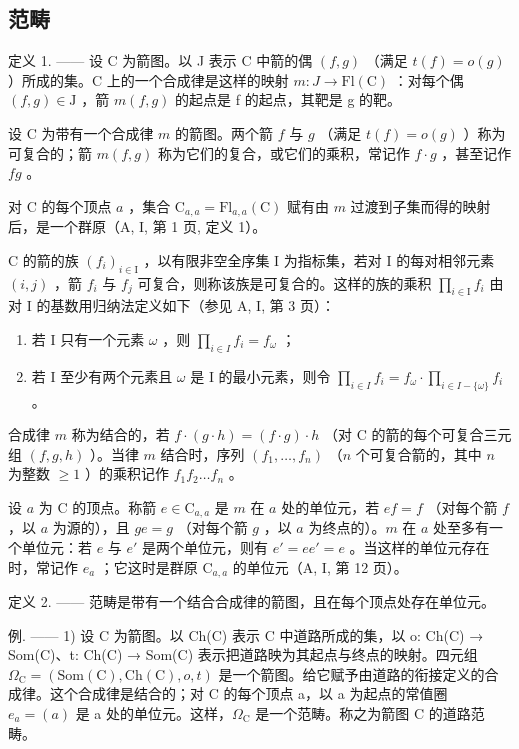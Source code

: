 \subsection{范畴}

定义 1. —— 设 C 为箭图。以 J 表示 C 中箭的偶 \((f,g)\) （满足 \(t(f)=o(g)\) ）所成的集。C 上的一个合成律是这样的映射 \(m:J\to\mathrm{Fl}(\mathrm{C})\) ：对每个偶 \((f,g)\in\mathrm{J}\) ，箭 \(m(f,g)\) 的起点是 f 的起点，其靶是 g 的靶。

设 C 为带有一个合成律 \(m\) 的箭图。两个箭 \(f\) 与 \(g\) （满足 \(t(f) = o(g)\) ）称为可复合的；箭 \(m(f, g)\) 称为它们的复合，或它们的乘积，常记作 \(f \cdot g\) ，甚至记作 \(fg\) 。

对 C 的每个顶点 \(a\) ，集合 \(\mathrm{C}_{a,a} = \mathrm{Fl}_{a,a}(\mathrm{C})\) 赋有由 \(m\) 过渡到子集而得的映射后，是一个群原（A, I, 第 1 页, 定义 1）。

C 的箭的族 \((f_{i})_{i\in\mathrm{I}}\) ，以有限非空全序集 I 为指标集，若对 I 的每对相邻元素 \((i,j)\) ，箭 \(f_{i}\) 与 \(f_{j}\) 可复合，则称该族是可复合的。这样的族的乘积 \(\prod_{i\in\mathrm{I}}f_{i}\) 由对 I 的基数用归纳法定义如下（参见 A, I, 第 3 页）：

\begin{enumerate}
\def\labelenumi{(\roman{enumi})}
\item
  若 I 只有一个元素 \(\omega\) ，则 \(\prod_{i\in I}f_i = f_\omega\) ；
\item
  若 I 至少有两个元素且 \(\omega\) 是 I 的最小元素，则令 \(\prod_{i\in I}f_i = f_\omega \cdot \prod_{i\in I - \{\omega \}}f_i\) 。
\end{enumerate}

合成律 \(m\) 称为结合的，若 \(f \cdot (g \cdot h) = (f \cdot g) \cdot h\) （对 C 的箭的每个可复合三元组 \((f, g, h)\) ）。当律 \(m\) 结合时，序列 \((f_1, \ldots, f_n)\) （\(n\) 个可复合箭的，其中 \(n\) 为整数 \(\geqslant 1\) ）的乘积记作 \(f_1 f_2 \ldots f_n\) 。

设 \(a\) 为 C 的顶点。称箭 \(e \in \mathrm{C}_{a,a}\) 是 \(m\) 在 \(a\) 处的单位元，若 \(ef = f\) （对每个箭 \(f\) ，以 \(a\) 为源的），且 \(ge = g\) （对每个箭 \(g\) ，以 \(a\) 为终点的）。\(m\) 在 \(a\) 处至多有一个单位元：若 \(e\) 与 \(e'\) 是两个单位元，则有 \(e' = ee' = e\) 。当这样的单位元存在时，常记作 \(e_a\) ；它这时是群原 \(\mathrm{C}_{a,a}\) 的单位元（A, I, 第 12 页）。

定义 2. —— 范畴是带有一个结合合成律的箭图，且在每个顶点处存在单位元。

例. —— 1) 设 C 为箭图。以 Ch(C) 表示 C 中道路所成的集，以 o: Ch(C) → Som(C)、t: Ch(C) → Som(C) 表示把道路映为其起点与终点的映射。四元组 \(\Omega_{\mathrm{C}} = (\mathrm{Som}(\mathrm{C}), \mathrm{Ch}(\mathrm{C}), o, t)\) 是一个箭图。给它赋予由道路的衔接定义的合成律。这个合成律是结合的；对 C 的每个顶点 a，以 a 为起点的常值圈 \(e_a = (a)\) 是 a 处的单位元。这样，\(\Omega_{\mathrm{C}}\) 是一个范畴。称之为箭图 C 的道路范畴。


